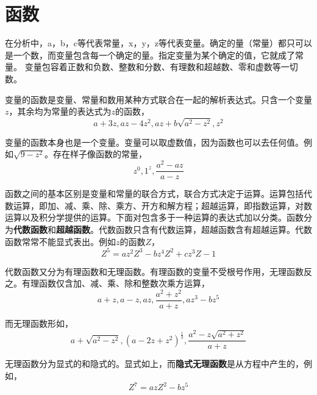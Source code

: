 \chapter{函数}\label{ch 1}

\begin{note}
    在分析中，a，b，c等代表常量，x，y，z等代表变量。确定的量（常量）都只可以是一个数，而变量包含每一个确定的量。指定变量为某个确定的值，它就成了常量。
    变量包容着正数和负数、整数和分数、有理数和超越数、零和虚数等一切数。
    
    变量的函数是变量、常量和数用某种方式联合在一起的解析表达式。只含一个变量$z$，其余均为常量的表达式为$z$的函数，
    \begin{equation*}
        a + 3z, az - 4z^2, az+b \sqrt{a^2 - z^2}, z^2
    \end{equation*}
    
    变量的函数本身也是一个变量。变量可以取虚数值，因为函数也可以去任何值。例如$\sqrt{9 - z^2}$。存在样子像函数的常量，
    \begin{equation*}
        z^0, 1^z, \frac{a^2 - az}{a - z}
    \end{equation*}
    
    函数之间的基本区别是变量和常量的联合方式，联合方式决定于运算。运算包括代数运算，即加、减、乘、除、乘方、开方和解方程；超越运算，即指数运算，对数运算以及积分学提供的运算。下面对包含多于一种运算的表达式加以分类。函数分为\textbf{代数函数}和\textbf{超越函数}。代数函数只含有代数运算，超越函数含有超越运算。代数函数常常不能显式表出。例如$z$的函数$Z$，
    \begin{equation*}
        Z^5 = az^2Z^3 - bz^4Z^2 + cz^3Z - 1
    \end{equation*}
    
    代数函数又分为有理函数和无理函数。有理函数的变量不受根号作用，无理函数反之。有理函数仅含加、减、乘、除和整数次乘方运算，
    \begin{equation*}
        a + z, a - z, az, \frac{a^2 + z^2}{a + z}, az^3 - bz^5
    \end{equation*}
    
    而无理函数形如，
    \begin{equation*}
        a + \sqrt{a^2 - z^2}, (a - 2z + z^2)^{\frac{1}{3}}, \frac{a^2 - z\sqrt{a^2 + z^2}}{a + z}
    \end{equation*}
    
    无理函数分为显式的和隐式的。显式如上，而\textbf{隐式无理函数}是从方程中产生的，例如，
    \begin{equation*}
        Z^7 = azZ^2 - bz^5
    \end{equation*}
    

\end{note}
